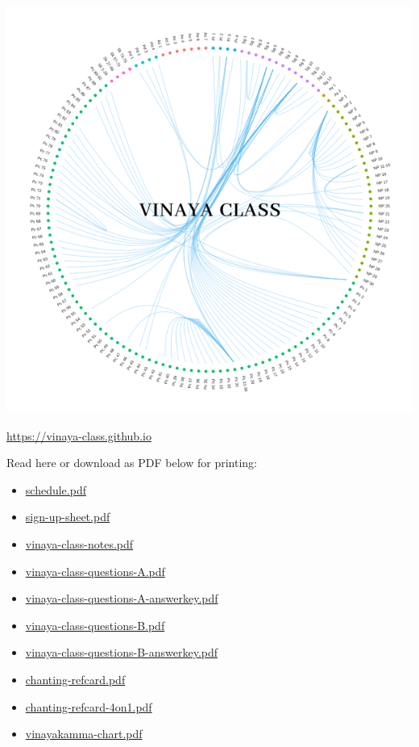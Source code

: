 \includegraphics{../../src/includes/figures/vinaya-class-title.png}

\url{https://vinaya-class.github.io}

Read here or download as PDF below for printing:

\begin{itemize}
\tightlist
\item
  \href{./includes/docs/schedule.pdf}{schedule.pdf}
\item
  \href{./includes/docs/sign-up-sheet.pdf}{sign-up-sheet.pdf}
\item
  \href{./includes/docs/vinaya-class-notes.pdf}{vinaya-class-notes.pdf}
\item
  \href{./includes/docs/vinaya-class-questions-A.pdf}{vinaya-class-questions-A.pdf}
\item
  \href{./includes/docs/vinaya-class-questions-A-answerkey.pdf}{vinaya-class-questions-A-answerkey.pdf}
\item
  \href{./includes/docs/vinaya-class-questions-B.pdf}{vinaya-class-questions-B.pdf}
\item
  \href{./includes/docs/vinaya-class-questions-B-answerkey.pdf}{vinaya-class-questions-B-answerkey.pdf}
\item
  \href{./includes/docs/chanting-refcard.pdf}{chanting-refcard.pdf}
\item
  \href{./includes/docs/chanting-refcard-4on1.pdf}{chanting-refcard-4on1.pdf}
\item
  \href{./includes/docs/vinayakamma-chart.pdf}{vinayakamma-chart.pdf}
\end{itemize}

